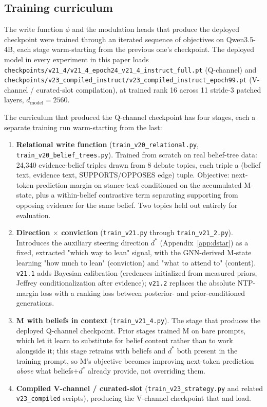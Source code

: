 \subsection{Training curriculum}
\label{app:curriculum}

The write function $\phi$ and the modulation heads that produce the deployed checkpoint
were trained through an iterated sequence of objectives on Qwen3.5-4B, each stage
warm-starting from the previous one's checkpoint. The deployed model in every experiment
in this paper loads \texttt{checkpoints/v21\_4/v21\_4\_epoch24\_v21\_4\_instruct\_full.pt}
(Q-channel) and \texttt{checkpoints/v23\_compiled\_instruct/v23\_compiled\_instruct\_epoch99.pt}
(V-channel / curated-slot compilation), at trained rank 16 across 11 stride-3 patched
layers, \(d_{\text{model}}=2560\).

The curriculum that produced the Q-channel checkpoint has four stages, each a separate
training run warm-starting from the last:

\begin{enumerate}
\item \textbf{Relational write function} (\texttt{train\_v20\_relational.py},
\texttt{train\_v20\_belief\_trees.py}). Trained from scratch on real belief-tree data:
24,340 evidence-belief triples drawn from 8 debate topics, each triple a
(belief text, evidence text, SUPPORTS/OPPOSES edge) tuple. Objective: next-token-prediction
margin on stance text conditioned on the accumulated M-state, plus a within-belief
contrastive term separating supporting from opposing evidence for the same belief. Two
topics held out entirely for evaluation.
\item \textbf{Direction $\times$ conviction} (\texttt{train\_v21.py} through
\texttt{train\_v21\_2.py}). Introduces the auxiliary steering direction $d^*$
(Appendix~\ref{app:dstar}) as a fixed, extracted "which way to lean" signal, with the
GNN-derived M-state learning "how much to lean" (conviction) and "what to attend to"
(content). \texttt{v21.1} adds Bayesian calibration (credences initialized from measured
priors, Jeffrey conditionalization after evidence); \texttt{v21.2} replaces the absolute
NTP-margin loss with a ranking loss between posterior- and prior-conditioned generations.
\item \textbf{M with beliefs in context} (\texttt{train\_v21\_4.py}). The stage that
produces the deployed Q-channel checkpoint. Prior stages trained M on bare prompts, which
let it learn to substitute for belief content rather than to work alongside it; this
stage retrains with beliefs and $d^*$ both present in the training prompt, so M's
objective becomes improving next-token prediction \emph{above} what beliefs+$d^*$ already
provide, not overriding them.
\item \textbf{Compiled V-channel / curated-slot} (\texttt{train\_v23\_strategy.py} and
related \texttt{v23\_compiled} scripts), producing the V-channel checkpoint that
\condF{} and \condC{} load.
\end{enumerate}

